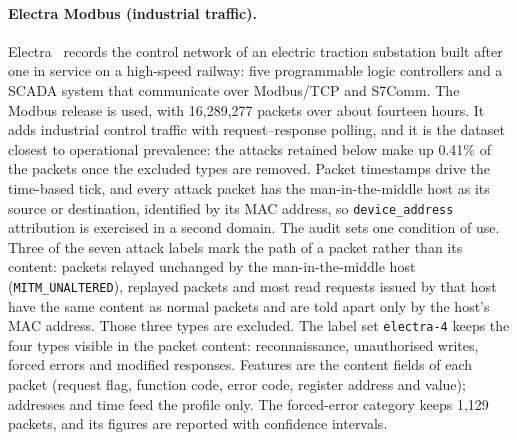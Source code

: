 \paragraph{Electra Modbus (industrial traffic).}
Electra~\cite{perales2019electra} records the control network of an electric traction
substation built after one in service on a high-speed railway: five programmable logic
controllers and a SCADA system that communicate over Modbus/TCP and S7Comm. The Modbus
release is used, with 16{,}289{,}277 packets over about fourteen hours. It adds
industrial control traffic with request--response polling, and it is the dataset closest
to operational prevalence: the attacks retained below make up 0.41\% of the packets once
the excluded types are removed. Packet timestamps drive the time-based tick, and every
attack packet has the man-in-the-middle host as its source or destination, identified by
its MAC address, so \texttt{device\_address} attribution is exercised in a second domain.
The audit sets one condition of use. Three of the seven attack labels mark the path of a
packet rather than its content: packets relayed unchanged by the man-in-the-middle host
(\texttt{MITM\_UNALTERED}), replayed packets and most read requests issued by that host
have the same content as normal packets and are told apart only by the host's MAC
address. Those three types are excluded. The label set \texttt{electra-4} keeps the four
types visible in the packet content: reconnaissance, unauthorised writes, forced errors
and modified responses. Features are the content fields of each packet (request flag,
function code, error code, register address and value); addresses and time feed the
profile only. The forced-error category keeps 1{,}129 packets, and its figures are
reported with confidence intervals.

